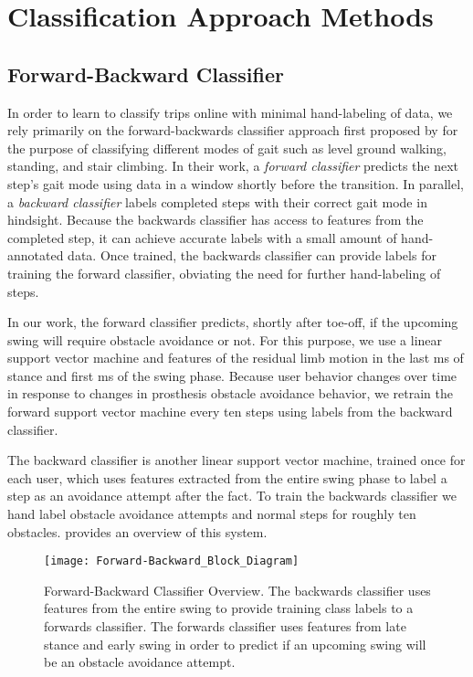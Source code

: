 \section{Classification Approach Methods}
\subsection{Forward-Backward Classifier}
In order to learn to classify trips online with minimal hand-labeling of data,
we rely primarily on the forward-backwards classifier approach first proposed by
\citet{spanias2018online} for the purpose of classifying different modes of gait
such as level ground walking, standing, and stair climbing. In their work, a
\emph{forward classifier} predicts the next step's gait mode using data in a
window shortly before the transition. In parallel, a \emph{backward classifier}
labels completed steps with their correct gait mode in hindsight. Because the
backwards classifier has access to features from the completed step, it can
achieve accurate labels with a small amount of hand-annotated data. Once
trained, the backwards classifier can provide labels for training the forward
classifier, obviating the need for further hand-labeling of steps. 

In our work, the forward classifier predicts, shortly after toe-off, if the
upcoming swing will require obstacle avoidance or not. For this purpose, we use
a linear support vector machine and features of the residual limb motion in the
last \unit[210]{ms} of stance and first \unit[90]{ms} of the swing phase.
Because user behavior changes over time in response to changes in prosthesis
obstacle avoidance behavior, we retrain the forward support vector machine every
ten steps using labels from the backward classifier. 

The backward classifier is another linear support vector machine, trained once
for each user, which uses features extracted from the entire swing phase to
label a step as an avoidance attempt after the fact. To train the backwards
classifier we hand label obstacle avoidance attempts and normal steps for
roughly ten obstacles.  provides an overview of this system.

\begin{figure}[tb]
    \centerline{\texttt{[image: Forward-Backward\_Block\_Diagram]}}
    \caption[Forward-Backward Classifier Overview]{Forward-Backward Classifier
    Overview. The backwards classifier uses features from the entire swing to
    provide training class labels to a forwards classifier. The forwards
    classifier uses features from late stance and early swing in order to
    predict if an upcoming swing will be an obstacle avoidance
    attempt.}\label{fig:fwd_back}
\end{figure}

